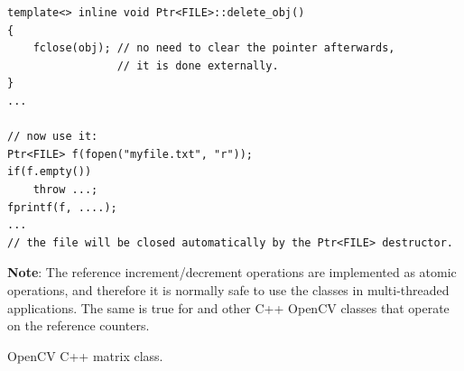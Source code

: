 \begin{lstlisting}
template<> inline void Ptr<FILE>::delete_obj()
{
    fclose(obj); // no need to clear the pointer afterwards,
                 // it is done externally.
}
...

// now use it:
Ptr<FILE> f(fopen("myfile.txt", "r"));
if(f.empty())
    throw ...;
fprintf(f, ....);
...
// the file will be closed automatically by the Ptr<FILE> destructor.
\end{lstlisting}  

\textbf{Note}: The reference increment/decrement operations are implemented as atomic operations, and therefore it is normally safe to use the classes in multi-threaded applications. The same is true for  and other C++ OpenCV classes that operate on the reference counters.

\label{Mat}

OpenCV C++ matrix class.


